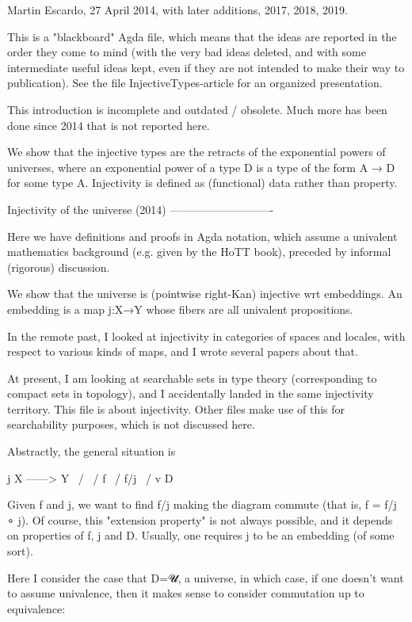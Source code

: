 Martin Escardo, 27 April 2014, with later additions, 2017, 2018, 2019.

This is a "blackboard" Agda file, which means that the ideas are
reported in the order they come to mind (with the very bad ideas
deleted, and with some intermediate useful ideas kept, even if they
are not intended to make their way to publication). See the file
InjectiveTypes-article for an organized presentation.

This introduction is incomplete and outdated / obsolete. Much more has
been done since 2014 that is not reported here.

We show that the injective types are the retracts of the exponential
powers of universes, where an exponential power of a type D is a type
of the form A → D for some type A. Injectivity is defined as
(functional) data rather than property.


Injectivity of the universe (2014)
----------------------------

Here we have definitions and proofs in Agda notation, which assume a
univalent mathematics background (e.g. given by the HoTT book),
preceded by informal (rigorous) discussion.

We show that the universe is (pointwise right-Kan) injective wrt
embeddings. An embedding is a map j:X→Y whose fibers are all univalent
propositions.

In the remote past, I looked at injectivity in categories of spaces
and locales, with respect to various kinds of maps, and I wrote
several papers about that.

At present, I am looking at searchable sets in type theory
(corresponding to compact sets in topology), and I accidentally landed
in the same injectivity territory. This file is about
injectivity. Other files make use of this for searchability purposes,
which is not discussed here.

Abstractly, the general situation is

                   j
              X ------> Y
               \       /
                \     /
             f   \   / f/j
                  \ /
                   v
                   D

Given f and j, we want to find f/j making the diagram commute (that
is, f = f/j ∘ j). Of course, this "extension property" is not always
possible, and it depends on properties of f, j and D. Usually, one
requires j to be an embedding (of some sort).

Here I consider the case that D=𝓤, a universe, in which case, if one
doesn't want to assume univalence, then it makes sense to consider
commutation up to equivalence:

